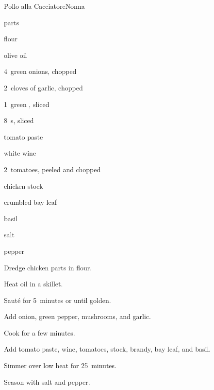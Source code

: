 \begin{recipe}{Pollo alla Cacciatore}{Nonna}{}

\begin{ingredients}
\item {}  parts
\item \C{\half} flour
\item {} olive oil
\item 4~green onions, chopped
\item 2~cloves of garlic, chopped
\item 1~green , sliced
\item 8~s, sliced
\item {} tomato paste
\item \C{\half} white wine
\item 2~tomatoes, peeled and chopped
\item \C{\threequarter} chicken stock
\item \C{\quarter} 
\item crumbled bay leaf
\item basil
\item salt
\item pepper
\end{ingredients}

\begin{directions}
\item Dredge chicken parts in flour.
\item Heat oil in a skillet.
\item Saut\'e for 5~minutes or until golden.
\item Add onion, green pepper, mushrooms, and garlic.
\item Cook for a few minutes.
\item Add tomato paste, wine, tomatoes, stock, brandy, bay leaf, and basil.
\item Simmer over low heat for 25~minutes.
\item Season with salt and pepper.
\end{directions}

\end{recipe}
